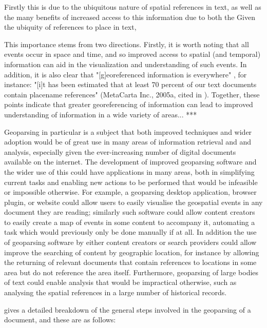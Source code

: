 \documentclass[12pt, a4paper]{report}
\begin{document}
Firstly this is due to the ubiquitous nature of spatial references in text, as well as the many benefits of increased access to this information  due to both the  Given the ubiquity of references to place in text,  

This importance stems from two directions. Firstly, it is worth noting that all events occur in space and time, and so improved access to spatial (and temporal) information can aid in the visualization and understanding of such events. In addition, it is also clear that "[g]eoreferenced information is everywhere" \citep{hill2006}, for instance: "[i]t has been estimated that at least 70 percent of our text documents contain placename references" (MetaCarta Inc., 2005a, cited in \citet[p.~5]{hill2006}). Together, these points indicate that greater georeferencing of information can lead to improved understanding of information in a wide variety of areas...
***

Geoparsing in particular is a subject that both improved techniques and wider adoption would be of great use in many areas of information retrieval and and analysis, especially given the ever-increasing number of digital documents available on the internet. The development of improved geoparsing software and the wider use of this could have applications in many areas, both in simplifying current tasks and enabling new actions to be performed that would be infeasible or impossible otherwise. For example, a geoparsing desktop application,  browser plugin, or website could allow users to easily visualise the geospatial events in any document they are reading; similarly such software could allow content creators to easily create a map of events in some content to accompany it, automating a task which would previously only be done manually if at all. In addition the use of geoparsing software by either content creators or search providers could allow improve the searching of content by geographic location, for instance by allowing the returning of relevant documents that contain references to locations in some area but do not reference the area itself. Furthermore, geoparsing of large bodies of text could enable analysis that would be impractical otherwise, such as analysing the spatial references in a large number of historical records.

\citet{hill2006} gives a detailed breakdown of the general steps involved in the geoparsing of a document, and these are as follows:
\end{document}
